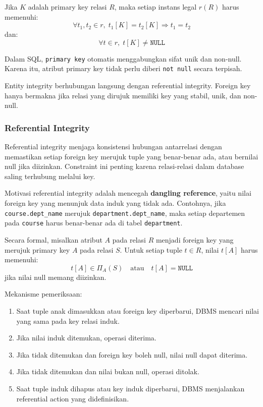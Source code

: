Jika \(K\) adalah primary key relasi \(R\), maka setiap instans legal \(r(R)\) harus memenuhi:
\begin{equation}
    \forall t_1,t_2 \in r,\; t_1[K]=t_2[K] \Rightarrow t_1=t_2
    \label{eq:key-unique}
\end{equation}
dan:
\begin{equation}
    \forall t \in r,\; t[K] \neq \texttt{NULL}
    \label{eq:key-not-null}
\end{equation}

Dalam SQL, \texttt{primary key} otomatis menggabungkan sifat unik dan non-null. Karena itu, atribut primary key tidak perlu diberi \texttt{not null} secara terpisah.

Entity integrity berhubungan langsung dengan referential integrity. Foreign key hanya bermakna jika relasi yang dirujuk memiliki key yang stabil, unik, dan non-null.

\subsubsection{Referential Integrity}

\begin{jawab}
Referential integrity menjaga konsistensi hubungan antarrelasi dengan memastikan setiap foreign key merujuk tuple yang benar-benar ada, atau bernilai null jika diizinkan. Constraint ini penting karena relasi-relasi dalam database saling terhubung melalui key.
\end{jawab}

Motivasi referential integrity adalah mencegah \textbf{dangling reference}, yaitu nilai foreign key yang menunjuk data induk yang tidak ada. Contohnya, jika \texttt{course.dept\_name} merujuk \texttt{department.dept\_name}, maka setiap departemen pada \texttt{course} harus benar-benar ada di tabel \texttt{department}.

Secara formal, misalkan atribut \(A\) pada relasi \(R\) menjadi foreign key yang merujuk primary key \(A\) pada relasi \(S\). Untuk setiap tuple \(t \in R\), nilai \(t[A]\) harus memenuhi:
\begin{equation}
    t[A] \in \Pi_A(S) \quad \text{atau} \quad t[A] = \texttt{NULL}
    \label{eq:referential-integrity}
\end{equation}
jika nilai null memang diizinkan.

Mekanisme pemeriksaan:
\begin{enumerate}
    \item Saat tuple anak dimasukkan atau foreign key diperbarui, DBMS mencari nilai yang sama pada key relasi induk.
    \item Jika nilai induk ditemukan, operasi diterima.
    \item Jika tidak ditemukan dan foreign key boleh null, nilai null dapat diterima.
    \item Jika tidak ditemukan dan nilai bukan null, operasi ditolak.
    \item Saat tuple induk dihapus atau key induk diperbarui, DBMS menjalankan referential action yang didefinisikan.
\end{enumerate}

